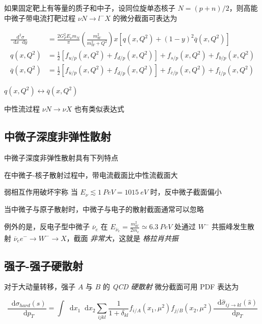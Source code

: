\documentclass[oneside,a4paper,openany,11pt]{ctexbook}
\newcommand*{\dif}{\mathop{}\!\mathrm{d}} %
\begin{document}
如果固定靶上有等量的质子和中子，设同位旋单态核子 $N=(p+n)/2$，则高能中微子带电流打靶过程 $\nu N \to l^- X$ 的微分截面可表达为

\begin{align}
    \frac{\dif^2 \sigma}{\dif x \dif y} &= \frac{2 G_F^2 E_\nu m_N}{\pi} \left(\frac{m_W^2}{m_W^2+Q^2}\right) x \left[q(x, Q^2)+(1-y)^2 \overline{q}(x, Q^2)\right] \\
    q(x, Q^2) &= \frac{1}{2} \left[f_{u/p}(x, Q^2) + f_{d/p}(x, Q^2)\right] + f_{s/p}(x, Q^2) + f_{b/p}(x, Q^2) \\
    \overline{q}(x, Q^2) &= \frac{1}{2} \left[f_{\overline{u}/p}(x, Q^2) + f_{\overline{d}/p}(x, Q^2)\right] + f_{\overline{c}/p}(x, Q^2) + f_{\overline{t}/p}(x, Q^2)
\end{align}

$q(x, Q^2) \leftrightarrow \overline{q}(x, Q^2)$

中性流过程 $\nu N \to \nu X$ 也有类似表达式

\subsection{中微子深度非弹性散射}

中微子深度非弹性散射具有下列特点

在中微子-核子散射过程中，带电流截面比中性流截面大

弱相互作用破坏宇称 当 $E_\nu \lesssim \qty{1}{PeV}=\qty{1015}{eV}$ 时，反中微子截面偏小

当中微子与原子散射时，中微子与电子的散射截面通常可以忽略

例外的是，反电子型中微子 $\overline{\nu}_e$ 在 $E_{\overline{\nu}_e}=\frac{m_W^2}{2 m_e} \simeq 6.3\ PeV$ 处通过 $W^-$ 共振峰发生散射 $\overline{\nu}_e e^- \to W^- \to X$，截面 \emph{非常大}，这就是 \emph{格拉肖共振}

\subsection{强子-强子硬散射}

对于大动量转移，强子 $A$ 与 $B$ 的 \emph{QCD 硬散射} 微分截面可用 PDF 表达为

\begin{equation}
    \frac{\dif\sigma_{hard}(s)}{\dif p_T} = \int \dif x_1 \dif x_2 \sum_{ijkl} \frac{1}{1+\delta_{kl}} f_{i/A}(x_1, \mu^2) f_{j/B}(x_2, \mu^2) \frac{\dif \hat{\sigma}_{ij \to kl}(\hat{s})}{\dif p_T}
\end{equation}
\end{document}
